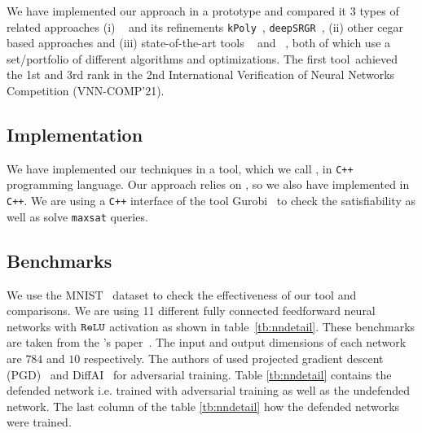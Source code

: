We have implemented our approach in a prototype and compared it 3 types of related approaches (i) \deeppoly{}~\cite{singh2019abstract} and its refinements \texttt{kPoly}~\cite{singh2019beyond}, \texttt{deepSRGR}~\cite{yang2021improving}, (ii) other cegar based approaches and 
(iii) state-of-the-art tools \alphabeta~\cite{alphabetacrown} and \ovaltool~\cite{ovaltool}, both of which use a set/portfolio of different algorithms and optimizations. The first tool~\alphabeta achieved the 1st and \ovaltool 3rd rank in the 2nd International Verification of Neural Networks Competition (VNN-COMP'21).
\subsection{Implementation}
We have implemented our techniques in a tool, which we call \drefine{}, in \texttt{C++} programming language. Our approach relies on \deeppoly{}, so we also have implemented \deeppoly{} in \texttt{C++}. We are using a \texttt{C++} interface of the tool Gurobi~\cite{?}  to check the satisfiability as well as solve  \texttt{maxsat} queries. %

\subsection{Benchmarks}
We use the MNIST~\cite{deng2012mnist} dataset to check the effectiveness of our tool and comparisons. We are using 11 different fully connected feedforward neural networks with $\texttt{ReLU}${} activation as shown in table~\ref{tb:nndetail}.
These benchmarks are taken from the \deeppoly{}'s paper~\cite{singh2019abstract}.  The input and output dimensions of each network are $784$ and $10$ respectively. 
The authors of \deeppoly{} used projected gradient descent (PGD)~\cite{dong2018boosting}
and DiffAI~\cite{mirman2018differentiable} for adversarial training. Table \ref{tb:nndetail} contains the defended network i.e.
trained with adversarial training as well as the undefended network. The last column of the table \ref{tb:nndetail} how the defended networks were trained.  

